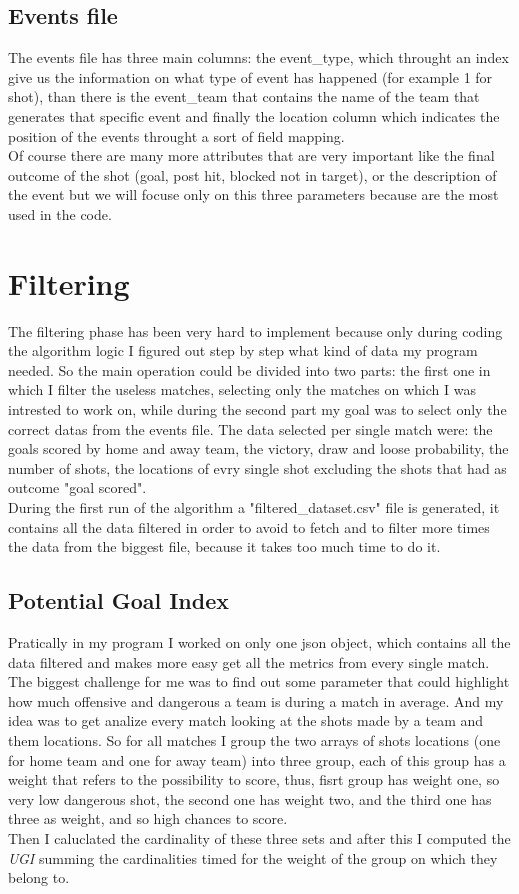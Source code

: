 \documentclass[a4paper,titlepage,11pt]{report}
\begin{document}
{\subsection{
Events file}
The events file has three main columns: the event\_type, which throught an index give us the information on what type of event has happened (for example 1 for shot), than there is the event\_team that contains the name of the team that generates that specific event and finally the location column which indicates the position of the events throught a sort of field mapping.\\
Of course there are many more attributes that are very important like the final outcome of the shot (goal, post hit, blocked not in target), or the description of the event but we will focuse only on this three parameters because are the most used in the code.

\section{
Filtering}
The filtering phase has been very hard to implement because only during coding the algorithm logic I figured out step by step what kind of data my program needed. So the main operation could be divided into two parts: the first one in which I filter the useless matches, selecting only the matches on which I was intrested to work on, while during the second part my goal was to select only the correct datas from the events file. The data selected per single match were: the goals scored by home and away team, the victory, draw and loose probability, the number of shots, the locations of evry single shot excluding the shots that had as outcome "goal scored".\\
During the first run of the algorithm a "filtered\_dataset.csv" file is generated, it contains all the data filtered in order to avoid to fetch and to filter more times the data from the biggest file, because it takes too much time to do it. 

\subsection{
Potential Goal Index}
Pratically in my program I worked on only one json object, which contains all the data filtered and makes more easy get all the metrics from every single match. The biggest challenge  for me was to find out some parameter that could highlight how much offensive and dangerous a team is  during a match in average. And my idea was to get analize every match looking at the shots made by a team and them locations. So for all matches I group the two arrays of shots locations (one for home team and one for away team) into three group, each of this group has a weight that refers to the possibility to score, thus, fisrt group has weight one, so very low dangerous shot, the second one has weight two, and the third one has three as weight, and so high chances to score.\\
Then I caluclated the cardinality of these three sets and after this I computed the \textit{UGI} summing the cardinalities timed for the weight of the group on which they belong to.


}
\end{document}
